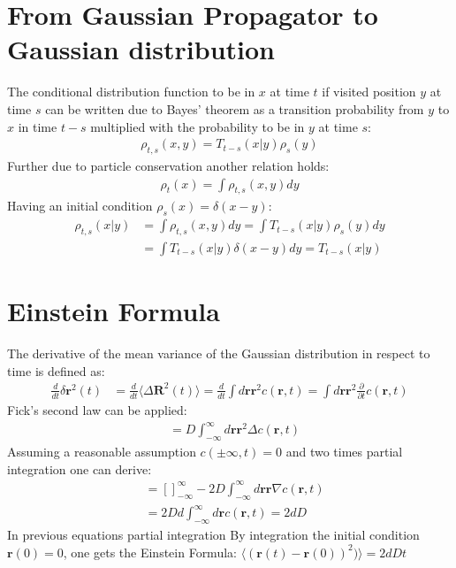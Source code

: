\documentclass[
  a4paper,BCOR10mm,oneside,
  bibtotoc,idxtotoc,
  headsepline,footsepline,%
  fleqn,openbib
]{scrbook}
\begin{document}
\section{From Gaussian Propagator to Gaussian distribution}\label{baystheorem}
The conditional distribution function to be in $x$ at time $t$ if visited position $y$ at time $s$   can be written due to Bayes' theorem as a transition probability from $y$ to $x$ in time $t-s$ multiplied with the probability to be in $y$ at time $s$:
\begin{align}
 \rho_{t,s}(x,y)=T_{t-s}(x|y) \rho_s(y)
\end{align}
Further due to particle conservation another relation holds:
\begin{align}
 \rho_{t}(x)= \int \rho_{t,s}(x,y) dy
\end{align}
Having an initial condition $\rho_{s}(x)= \delta(x-y)$:
\begin{align}
 \rho_{t,s}(x|y)&= \int \rho_{t,s}(x,y) dy = \int T_{t-s}(x|y) \rho_s(y) dy\\
 &= \int T_{t-s}(x|y) \delta(x-y) dy 
 = T_{t-s}(x|y)
\end{align}
\section{Einstein Formula} \label{einsteinrealtionappendix}
The derivative of the mean variance of the Gaussian distribution in respect to time is defined as:
\begin{align}
 \frac{d}{dt}  \delta \bm{r}^2(t)&=\frac{d}{dt} \langle \Delta \bm{ R}^2(t)\rangle  =\frac{d}{dt} \int d\bm{r} \bm{r}^2 c(\bm{r},t)=\int d\bm{r} \bm{r}^2 \frac{\partial}{\partial t} c(\bm{r},t) 
\end{align}
Fick's second law can be applied:
\begin{align}
&= D \int_{-\infty}^{\infty}d\bm{r} \bm{r}^2 \Delta c(\bm{r},t)  
\end{align}
Assuming a reasonable assumption  $c(\pm \infty,t)=0$  and two times partial integration one can derive:
\begin{align}
&= \left[ \right]_{-\infty}^{\infty}-2 D \int_{-\infty}^{\infty} d\bm{r} \bm{r} \nabla c(\bm{r},t) \\ &= 2 D d \int_{-\infty}^{\infty} d\bm{r} c(\bm{r},t) =2dD
\end{align}
In previous equations partial integration  By integration the initial condition $\bm{r}(0) = 0$,  one gets the Einstein Formula: $\langle (\bm{r}(t)-\bm{r}(0))^2)\rangle= 2dDt$
\end{document}
